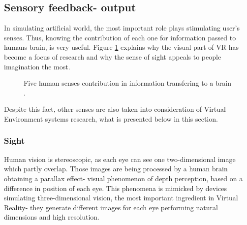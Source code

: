\subsection{Sensory feedback- output}%
In simulating artificial world, the most important role plays stimulating user's senses. Thus, knowing the contribution of each one for information passed to humans brain, is very useful. Figure \ref{fig:senses} explains why the visual part of VR has become a focus of research and why the sense of sight appeals to people imagination the most. 
\begin{figure}[h]
\centering
{}
\caption{Five human senses contribution in information transfering to a brain \cite{Mazuryk96}.}
\label{fig:senses}
\end{figure}
Despite this fact, other senses are also taken into consideration of Virtual Environment systems research, what is presented below in this section. 
\subsubsection{Sight}\label{sight}
Human vision is stereoscopic, as each eye can see one two-dimensional image which partly overlap. Those images are being processed by a human brain obtaining a parallax effect- visual phenomenon of depth perception, based on a difference in position of each eye. This phenomena is mimicked by devices simulating three-dimensional vision, the most important ingredient in Virtual Reality- they generate different images for each eye performing natural dimensions and high resolution. 

